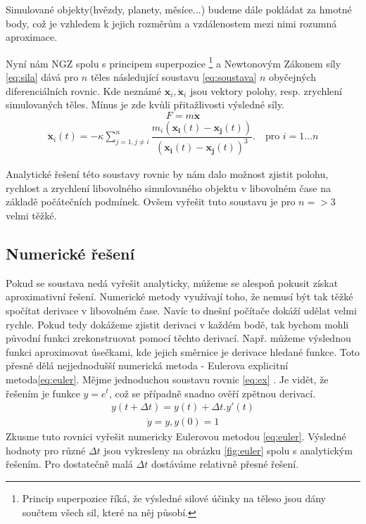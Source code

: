 Simulované objekty(hvězdy, planety, měsíce...) budeme dále pokládat za hmotné body, což je vzhledem k jejich rozměrům a vzdálenostem mezi nimi rozumná aproximace.

Nyní nám NGZ spolu s principem superpozice
\footnote{Princip superpozice říká, že výsledné silové účinky na těleso jsou dány součtem všech sil, které na něj působí.}
 a Newtonovým Zákonem síly \eqref{eq:sila} dává pro $ n $ těles následující soustavu \eqref{eq:soustava} $ n $ obyčejných diferenciálních rovnic. 
 Kde neznámé $ \boldsymbol {x}_i, \boldsymbol{\ddot x}_i $ jsou vektory polohy, resp. zrychlení simulovaných těles. Mínus je zde kvůli přitažlivosti výsledné síly.
\begin{equation}
F= m  \boldsymbol {\ddot x}
\label{eq:sila}
\end{equation}
\begin{align}\label{eq:soustava}
\boldsymbol {\ddot x}_i(t)  = -\kappa \sum_{j=1,j \neq i}^{n}\dfrac{m_i\left( \boldsymbol{x_i}(t) - \boldsymbol{x_j}(t)\right)}
{\left( \boldsymbol{x_i}(t) - \boldsymbol{x_j}(t)\right) ^3} . 
\quad \text{pro } i=1 \dots n
\end{align}

Analytické řešení této soustavy rovnic by nám dalo možnost zjistit polohu, rychlost a zrychlení libovolného simulovaného objektu v libovolném čase na základě počátečních podmínek. Ovšem vyřešit tuto soustavu je pro $ n=>3 $ velmi těžké.

\subsection{Numerické řešení}
\label{sec:numReseni}
Pokud se soustava nedá vyřešit analyticky, můžeme se alespoň pokusit získat aproximativní řešení. Numerické metody využívají toho, že nemusí být tak těžké spočítat derivace v libovolném čase. Navíc to dnešní počítače dokáží udělat velmi rychle. Pokud tedy dokážeme zjistit derivaci v každém bodě, tak bychom mohli původní funkci zrekonstruovat pomocí těchto derivací. Např. můžeme výslednou funkci aproximovat úsečkami, kde jejich směrnice je derivace hledané funkce. Toto přesně dělá nejjednodušší numerická metoda - Eulerova explicitní metoda\eqref{eq:euler}.
Mějme jednoduchou soustavu rovnic \eqref{eq:ex} . Je vidět, že řešením je funkce $ y=e^t $, což se případně snadno ověří zpětnou derivací. 
\begin{align} \label{eq:euler}
y(t+\Delta t) = y(t) + \Delta t . y'(t)
\end{align}
\begin{align} \label{eq:ex}
\dot	y = y, y(0)=1
\end{align}
Zkusme tuto rovnici vyřešit numericky Eulerovou metodou \eqref{eq:euler}. 
Výsledné hodnoty pro různé  $ \Delta t $ jsou vykresleny na obrázku \ref{fig:euler} spolu s analytickým řešením.
Pro dostatečně malá  $ \Delta t $ dostáváme relativně přesné řešení.


